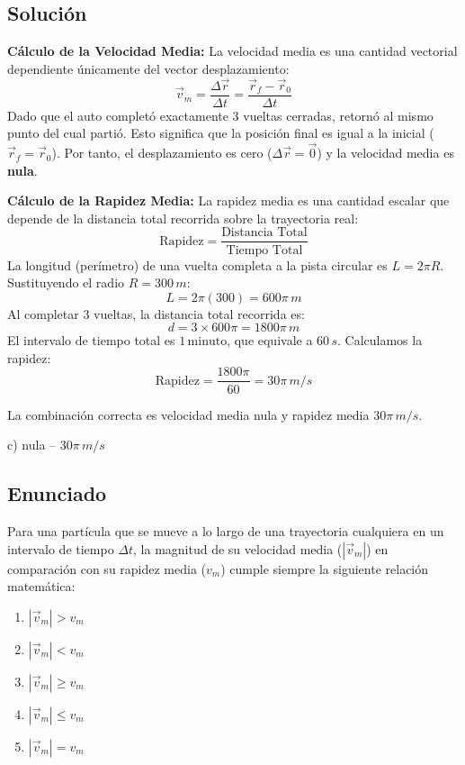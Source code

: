\documentclass[12pt, a4paper]{article}
\begin{document}
\subsection*{Solución}

\textbf{Cálculo de la Velocidad Media:}
La velocidad media es una cantidad vectorial dependiente únicamente del vector desplazamiento:
$$ \vec{v}_m = \frac{\Delta \vec{r}}{\Delta t} = \frac{\vec{r}_f - \vec{r}_0}{\Delta t} $$
Dado que el auto completó exactamente 3 vueltas cerradas, retornó al mismo punto del cual partió. Esto significa que la posición final es igual a la inicial ($\vec{r}_f = \vec{r}_0$). Por tanto, el desplazamiento es cero ($\Delta \vec{r} = \vec{0}$) y la velocidad media es \textbf{nula}.

\textbf{Cálculo de la Rapidez Media:}
La rapidez media es una cantidad escalar que depende de la distancia total recorrida sobre la trayectoria real:
$$ \text{Rapidez} = \frac{\text{Distancia Total}}{\text{Tiempo Total}} $$
La longitud (perímetro) de una vuelta completa a la pista circular es $L = 2\pi R$.
Sustituyendo el radio $R = 300\,\si{m}$:
$$ L = 2\pi (300) = 600\pi\,\si{m} $$
Al completar 3 vueltas, la distancia total recorrida es:
$$ d = 3 \times 600\pi = 1800\pi\,\si{m} $$
El intervalo de tiempo total es $1\,\text{minuto}$, que equivale a $60\,\si{s}$.
Calculamos la rapidez:
$$ \text{Rapidez} = \frac{1800\pi}{60} = 30\pi\,\si{m/s} $$

La combinación correcta es velocidad media nula y rapidez media $30\pi\,\si{m/s}$.

\begin{tcolorbox}[colback=green!5!white, colframe=green!50!black, title=Respuesta Final]
\centering \Large c) nula -- $30\pi \,\si{m/s}$
\end{tcolorbox}

\newpage

\subsection*{Enunciado}
Para una partícula que se mueve a lo largo de una trayectoria cualquiera en un intervalo de tiempo $\Delta t$, la magnitud de su velocidad media ($|\vec{v}_m|$) en comparación con su rapidez media ($v_m$) cumple siempre la siguiente relación matemática:
\begin{enumerate}[label=\alph*)]
    \item $|\vec{v}_m| > v_m$
    \item $|\vec{v}_m| < v_m$
    \item $|\vec{v}_m| \ge v_m$
    \item $|\vec{v}_m| \le v_m$
    \item $|\vec{v}_m| = v_m$
\end{enumerate}
\end{document}
